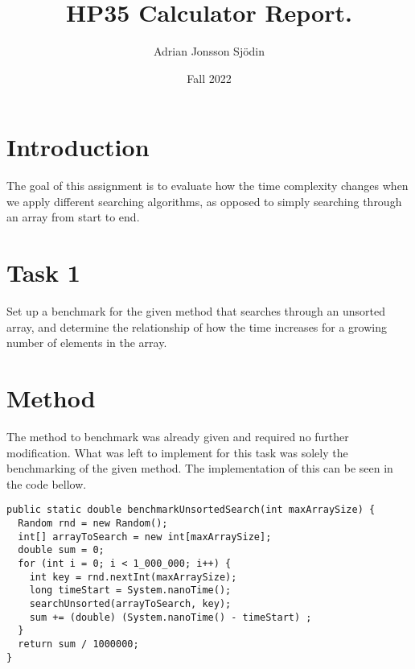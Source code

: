 \documentclass[a4paper,11pt]{article}
\begin{document}
\title{
  \textbf{HP35 Calculator Report.}
}
\author{Adrian Jonsson Sjödin}
\date{Fall 2022}

\maketitle

\section*{Introduction}
The goal of this assignment is to evaluate how the time complexity changes when we apply different searching algorithms, as opposed to simply
searching through an array from start to end.
\section*{Task 1}

Set up a benchmark for the given method that searches through an unsorted array, and determine the relationship of how the time increases for a 
growing number of elements in the array. 

\section*{Method}

The method to benchmark was already given and required no further modification. What was left to implement for this task was solely the benchmarking 
of the given method. The implementation of this can be seen in the code bellow.

\begin{verbatim}
public static double benchmarkUnsortedSearch(int maxArraySize) {
  Random rnd = new Random();
  int[] arrayToSearch = new int[maxArraySize];
  double sum = 0;
  for (int i = 0; i < 1_000_000; i++) {
    int key = rnd.nextInt(maxArraySize);
    long timeStart = System.nanoTime();
    searchUnsorted(arrayToSearch, key);
    sum += (double) (System.nanoTime() - timeStart) ;
  }
  return sum / 1000000;
}
\end{verbatim}
\end{document}
